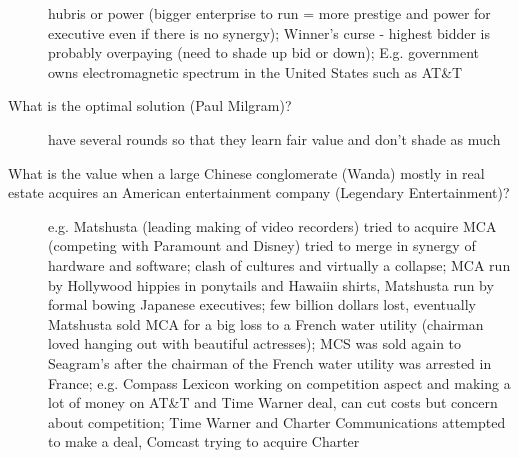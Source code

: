 \documentclass[11pt]{article}
\begin{document}
\begin{description}
  hubris or power (bigger enterprise to run = more prestige and power for executive even if there is no synergy);
  Winner's curse - highest bidder is probably overpaying (need to shade up bid or down);
  E.g. government owns electromagnetic spectrum in the United States such as AT\&T
\item[What is the optimal solution (Paul Milgram)?]
  have several rounds so that they learn fair value and don't shade as much
\item[What is the value when a large Chinese conglomerate (Wanda) mostly in real estate acquires an American entertainment company (Legendary Entertainment)?]
  e.g. Matshusta (leading making of video recorders) tried to acquire MCA (competing with Paramount and Disney) tried to merge in synergy of hardware and software;
  clash of cultures and virtually a collapse; MCA run by Hollywood hippies in ponytails and Hawaiin shirts, Matshusta run by formal bowing Japanese executives;
  few billion dollars lost, eventually Matshusta sold MCA for a big loss to a French water utility (chairman loved hanging out with beautiful actresses);
  MCS was sold again to Seagram's after the chairman of the French water utility was arrested in France;
  e.g. Compass Lexicon working on competition aspect and making a lot of money on AT\&T and Time Warner deal, can cut costs but concern about competition;
  Time Warner and Charter Communications attempted to make a deal, Comcast trying to acquire Charter
\end{description}
\end{document}
